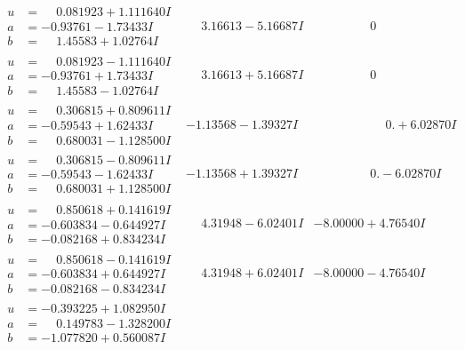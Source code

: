 \documentclass[1p]{elsarticle_modified}
\theoremstyle{definition}
\begin{document}
$$\begin{array}{c|c|c}
\begin{aligned}
u &= \phantom{-}0.081923 + 1.111640 I \\
a &= -0.93761 - 1.73433 I \\
b &= \phantom{-}1.45583 + 1.02764 I\end{aligned}
 & \phantom{-}3.16613 - 5.16687 I & \phantom{-0.000000 } 0 \\ \hline\begin{aligned}
u &= \phantom{-}0.081923 - 1.111640 I \\
a &= -0.93761 + 1.73433 I \\
b &= \phantom{-}1.45583 - 1.02764 I\end{aligned}
 & \phantom{-}3.16613 + 5.16687 I & \phantom{-0.000000 } 0 \\ \hline\begin{aligned}
u &= \phantom{-}0.306815 + 0.809611 I \\
a &= -0.59543 + 1.62433 I \\
b &= \phantom{-}0.680031 - 1.128500 I\end{aligned}
 & -1.13568 - 1.39327 I & \phantom{-0.000000 -}0. + 6.02870 I \\ \hline\begin{aligned}
u &= \phantom{-}0.306815 - 0.809611 I \\
a &= -0.59543 - 1.62433 I \\
b &= \phantom{-}0.680031 + 1.128500 I\end{aligned}
 & -1.13568 + 1.39327 I & \phantom{-0.000000 } 0. - 6.02870 I \\ \hline\begin{aligned}
u &= \phantom{-}0.850618 + 0.141619 I \\
a &= -0.603834 - 0.644927 I \\
b &= -0.082168 + 0.834234 I\end{aligned}
 & \phantom{-}4.31948 - 6.02401 I & -8.00000 + 4.76540 I \\ \hline\begin{aligned}
u &= \phantom{-}0.850618 - 0.141619 I \\
a &= -0.603834 + 0.644927 I \\
b &= -0.082168 - 0.834234 I\end{aligned}
 & \phantom{-}4.31948 + 6.02401 I & -8.00000 - 4.76540 I \\ \hline\begin{aligned}
u &= -0.393225 + 1.082950 I \\
a &= \phantom{-}0.149783 - 1.328200 I \\
b &= -1.077820 + 0.560087 I\end{aligned}

\end{array}$$
\end{document}
